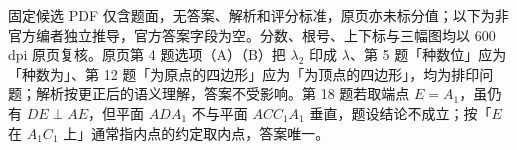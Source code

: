 

\begin{gktip}
固定候选 PDF 仅含题面，无答案、解析和评分标准，原页亦未标分值；以下为非官方编者独立推导，官方答案字段为空。分数、根号、上下标与三幅图均以 600 dpi 原页复核。原页第 4 题选项（A）（B）把 $\lambda_2$ 印成 $\lambda$、第 5 题「种数位」应为「种数为」、第 12 题「为原点的四边形」应为「为顶点的四边形」，均为排印问题；解析按更正后的语义理解，答案不受影响。第 18 题若取端点 $E=A_1$，虽仍有 $DE\perp AE$，但平面 $ADA_1$ 不与平面 $ACC_1A_1$ 垂直，题设结论不成立；按「$E$ 在 $A_1C_1$ 上」通常指内点的约定取内点，答案唯一。
\end{gktip}

